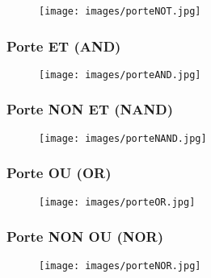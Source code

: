 \documentclass[11pt,a4paper,french,twoside]{PMCours}
\begin{document}
\begin{center}
\begin{figure}[ht]
\centering
\texttt{[image: images/porteNOT.jpg]}
\end{figure}
\end{center}

\subsubsection{Porte ET (AND)}

\begin{center}
\begin{figure}[ht]
\centering
\texttt{[image: images/porteAND.jpg]}
\end{figure}
\end{center}

\subsubsection{Porte NON ET (NAND)}

\begin{center}
\begin{figure}[ht]
\centering
\texttt{[image: images/porteNAND.jpg]}
\end{figure}
\end{center}

\subsubsection{Porte OU (OR)}

\begin{center}
\begin{figure}[ht]
\centering
\texttt{[image: images/porteOR.jpg]}
\end{figure}
\end{center}


\subsubsection{Porte NON OU (NOR)}

\begin{center}
\begin{figure}[ht]
\centering
\texttt{[image: images/porteNOR.jpg]}
\end{figure}
\end{center}
\end{document}
